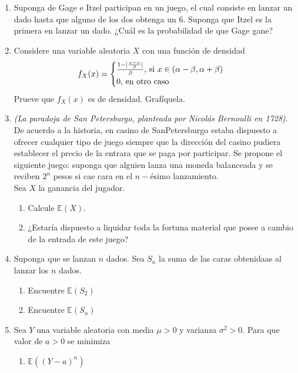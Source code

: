 \documentclass[12pt,a4paper]{report}
\begin{document}
	\begin{enumerate}
		\item{
			Suponga de Gage e Itzel participan en un juego, el cual consiste en
			lanzar un dado hasta que alguno de los dos obtenga un 6. Suponga
			que Itzel es la primera en lanzar un dado. ¿Cuál es la probabilidad
			de que Gage gane?
		}

		\item{
			Considere una variable aleatoria $X$ con una función de densidad
			\[
				f_X(x) = \begin{cases}
					\frac{1-|\frac{x-\alpha}{\beta}|}{\beta},
					$ si $ x \in (\alpha - \beta, \alpha + \beta)\\
					0, $ en otro caso$
				\end{cases}
			\]
			Prueve que $f_X(x)$ es de densidad. Grafíquela.
		}

		\item{
			\textit{(La paradoja de San Petersburgo, planteada por Nicolás
			Bernoulli en 1728)}.\\
			De acuerdo a la historia, en casino de SanPetersburgo estaba
			dispuesto a ofrecer cualquier tipo de juego siempre que la
			dirección del casino pudiera establecer el precio de la entrara
			que se paga por participar. Se propone el siguiente juego: suponga
			que alguien lanza una moneda balanceada y se reciben $2^n$ pesos
			si cae cara en el $n-$ésimo lanzamiento.\\
			Sea $X$ la ganancia del jugador.
			\begin{enumerate}
				\item {
				Calcule $\mathbb{E}(X)$.
				}

				\item {
				¿Estaría dispuesto a liquidar toda la fortuna material que
				posee a cambio de la entrada de este juego?
				}
			\end{enumerate}
		}

		\item{
			Suponga que se lanzan $n$ dados. Sea $S_n$ la suma de las caras
			obtenidaas al lanzar los $n$ dados.
			\begin{enumerate}
				\item {
					Encuentre $\mathbb{E}(S_2)$
				}

				\item {
					Encuentre $\mathbb{E}(S_n)$
				}
			\end{enumerate}
		}

		\item{
			Sea $Y$ una variable aleatoria con media $\mu > 0$ y varianza
			$\sigma^2 > 0$. Para que valor de $a > 0$ se minimiza
			\begin{enumerate}
				\item {
					$\mathbb{E}((Y-a)^n)$
				}


\end{enumerate}}
\end{enumerate}
\end{document}
